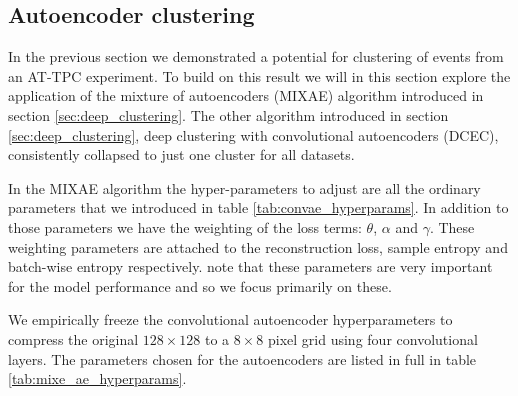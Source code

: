 \documentclass[preprint,12pt]{elsarticle}
\begin{document}
\subsection{Autoencoder clustering}

In the previous section we demonstrated a potential for clustering of events from an AT-TPC experiment. To build on this result we will in this section explore the application of the mixture of autoencoders (MIXAE) algorithm introduced in section \ref{sec:deep_clustering}. The other algorithm introduced in section \ref{sec:deep_clustering}, deep clustering with convolutional autoencoders (DCEC), consistently collapsed to just one cluster for all datasets.

In the MIXAE algorithm the hyper-parameters to adjust are all the ordinary parameters that we introduced in table \ref{tab:convae_hyperparams}. In addition to those parameters we have the weighting of the loss terms: $\theta$, $\alpha$ and $\gamma$. These weighting parameters are attached to the reconstruction loss, sample entropy and batch-wise entropy respectively. \cite{Zhang} note that these parameters are very important for the model performance and so we focus primarily on these. 

We empirically freeze the convolutional autoencoder hyperparameters to compress the original $128 \times 128$ to a $8 \times 8$ pixel grid using four convolutional layers. The parameters chosen for the autoencoders are listed in full in table \ref{tab:mixe_ae_hyperparams}.
\end{document}
